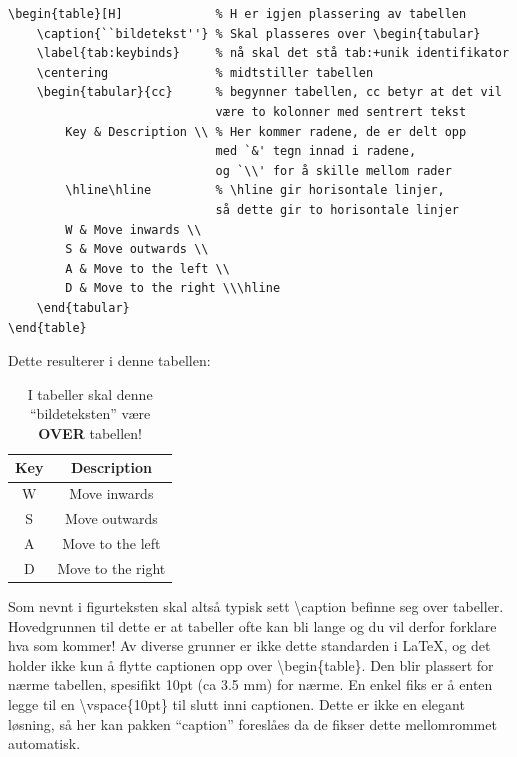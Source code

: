         
        \begin{verbatim}
\begin{table}[H]             % H er igjen plassering av tabellen 
    \caption{``bildetekst''} % Skal plasseres over \begin{tabular}
    \label{tab:keybinds}     % nå skal det stå tab:+unik identifikator
    \centering               % midtstiller tabellen
    \begin{tabular}{cc}      % begynner tabellen, cc betyr at det vil 
                             være to kolonner med sentrert tekst
        Key & Description \\ % Her kommer radene, de er delt opp 
                             med `&' tegn innad i radene, 
                             og `\\' for å skille mellom rader
        \hline\hline         % \hline gir horisontale linjer, 
                             så dette gir to horisontale linjer
        W & Move inwards \\
        S & Move outwards \\
        A & Move to the left \\
        D & Move to the right \\\hline
    \end{tabular}
\end{table}
        \end{verbatim}
        Dette resulterer i denne tabellen:
        \begin{table}[H]
            \caption{I tabeller skal denne ``bildeteksten'' være \textbf{OVER} tabellen!}
            \label{tab:keybinds}
            \centering
            \begin{tabular}{cc}
                Key & Description \\
                \hline\hline
                W & Move inwards \\
                S & Move outwards \\
                A & Move to the left \\
                D & Move to the right \\\hline
            \end{tabular}
        \end{table}
        
        Som nevnt i figurteksten skal altså typisk sett \textbackslash caption befinne seg over tabeller. Hovedgrunnen til dette er at tabeller ofte kan bli lange og du vil derfor forklare hva som kommer! Av diverse grunner er ikke dette standarden i \LaTeX, og det holder ikke kun å flytte captionen opp over \textbackslash begin\{table\}. Den blir plassert for nærme tabellen, spesifikt 10pt (ca 3.5 mm) for nærme. En enkel fiks er å enten legge til en \textbackslash vspace\{10pt\} til slutt inni captionen. Dette er ikke en elegant løsning, så her kan pakken ``caption'' foreslåes da de fikser dette mellomrommet automatisk. 
        
